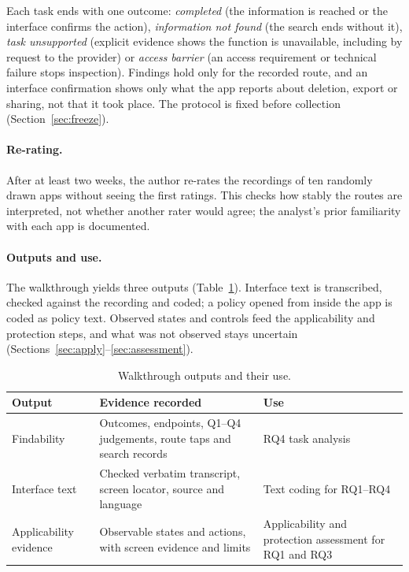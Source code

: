 Each task ends with one outcome: \emph{completed} (the information is reached or the interface
confirms the action), \emph{information not found} (the search ends without it), \emph{task
unsupported} (explicit evidence shows the function is unavailable, including by request to the
provider) or \emph{access barrier} (an access requirement or technical failure stops
inspection). Findings hold only for the recorded route, and an interface confirmation shows only
what the app reports about deletion, export or sharing, not that it took place. The protocol is
fixed before collection (Section~\ref{sec:freeze}).

\paragraph{Re-rating.} After at least two weeks, the author re-rates the recordings of ten
randomly drawn apps without seeing the first ratings. This checks how stably the routes are
interpreted, not whether another rater would agree; the analyst's prior familiarity with each app
is documented.

\paragraph{Outputs and use.} The walkthrough yields three outputs
(Table~\ref{tab:wt-outputs}). Interface text is transcribed, checked against the recording and
coded; a policy opened from inside the app is coded as policy text. Observed states and controls
feed the applicability and protection steps, and what was not observed stays uncertain
(Sections~\ref{sec:apply}--\ref{sec:assessment}).

\begin{table}[H]
\centering
\begin{singlespace}
\caption[Walkthrough outputs and their use]{Walkthrough outputs and their use.}
\label{tab:wt-outputs}
\footnotesize
\begin{tabularx}{\textwidth}{@{}>{\raggedright\arraybackslash}p{3.0cm}>{\raggedright\arraybackslash}X>{\raggedright\arraybackslash}p{4.4cm}@{}}
\toprule
\textbf{Output} & \textbf{Evidence recorded} & \textbf{Use} \\
\midrule
Findability & Outcomes, endpoints, Q1--Q4 judgements, route taps and search records
  & RQ4 task analysis \\
\cmidrule[0.3pt]{2-3}
Interface text & Checked verbatim transcript, screen locator, source and language
  & Text coding for RQ1--RQ4 \\
\cmidrule[0.3pt]{2-3}
Applicability evidence & Observable states and actions, with screen evidence and limits
  & Applicability and protection assessment for RQ1 and RQ3 \\
\bottomrule
\end{tabularx}
\end{singlespace}
\end{table}

